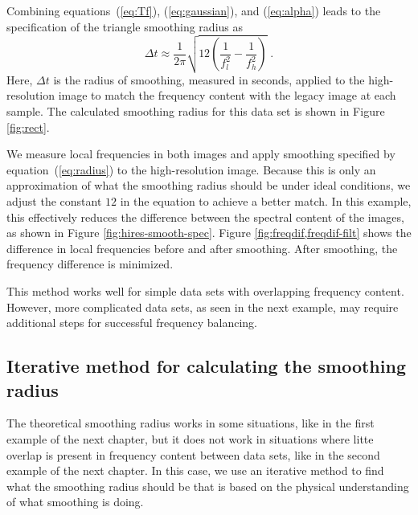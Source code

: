         Combining equations~(\ref{eq:Tf}), (\ref{eq:gaussian}), and (\ref{eq:alpha}) leads to the specification of the triangle smoothing radius as
        \begin{equation}
            \label{eq:radius}
            \Delta t \approx \frac{1}{2\pi}\sqrt{12\left(\frac{1}{f_{l}^{2}}-\frac{1}{f_{h}^{2}}\right)}\;.
        \end{equation}
        Here, $\Delta t$ is the radius of smoothing, measured in seconds, applied to the high-resolution image to match the frequency content with the legacy image at each sample. 
        The calculated smoothing radius for this data set is shown in Figure \ref{fig:rect}.
        
        
        We measure local frequencies in both images and apply smoothing specified by equation~(\ref{eq:radius}) to the high-resolution image.
        Because this is only an approximation of what the smoothing radius should be under ideal conditions, we adjust the constant $12$ in the equation to achieve a better match. 
        In this example, this effectively reduces the difference between the spectral content of the images, as shown in Figure \ref{fig:hires-smooth-spec}. 
        Figure \ref{fig:freqdif,freqdif-filt} shows the difference in local frequencies before and after smoothing. 
        After smoothing, the frequency difference is minimized. 
        
        This method works well for simple data sets with overlapping frequency content. 
        However, more complicated data sets, as seen in the next example, may require additional steps for successful frequency balancing.



        \subsection{Iterative method for calculating the smoothing radius}
        The theoretical smoothing radius works in some situations, like in the first example of the next chapter, but it does not work in situations where litte overlap is present in frequency content between data sets, like in the second example of the next chapter.
        In this case, we use an iterative method to find what the smoothing radius should be that is based on the physical understanding of what smoothing is doing.

